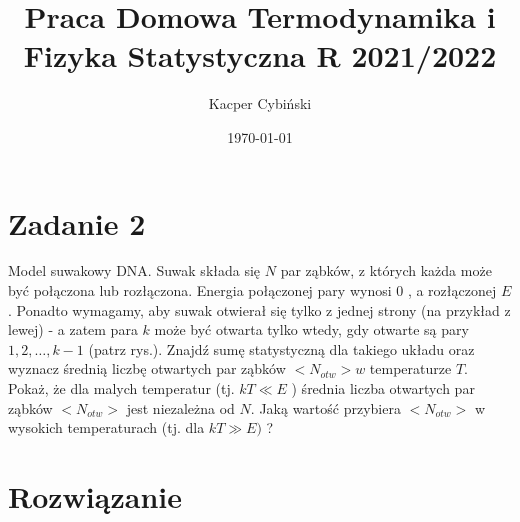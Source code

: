 \documentclass[12pt,a4paper]{article}
\title{Praca Domowa Termodynamika i Fizyka Statystyczna R 2021/2022}
\author{Kacper Cybiński}
\date{\today}
\begin{document}
\maketitle

\section{Zadanie 2}

Model suwakowy DNA. Suwak składa się $N$ par ząbków, z których każda może być połączona lub rozłączona. Energia połączonej pary wynosi 0 , a rozłączonej $E$. Ponadto wymagamy, aby suwak otwierał się tylko z jednej strony (na przykład z lewej) - a zatem para $k$ może być otwarta tylko wtedy, gdy otwarte są pary $1,2, \ldots, k-1$ (patrz rys.). Znajdź sumę statystyczną dla takiego układu oraz wyznacz średnią liczbę otwartych par ząbków $<N_{o t w}>w$ temperaturze $T$. Pokaż, że dla malych temperatur (tj. $k T \ll E$ ) średnia liczba otwartych par ząbków $<N_{o t w}>$ jest niezależna od $N$. Jaką wartość przybiera $<N_{o t w}>$ w wysokich temperaturach (tj. dla $k T \gg E)$ ?


\section{Rozwiązanie}
\end{document}
